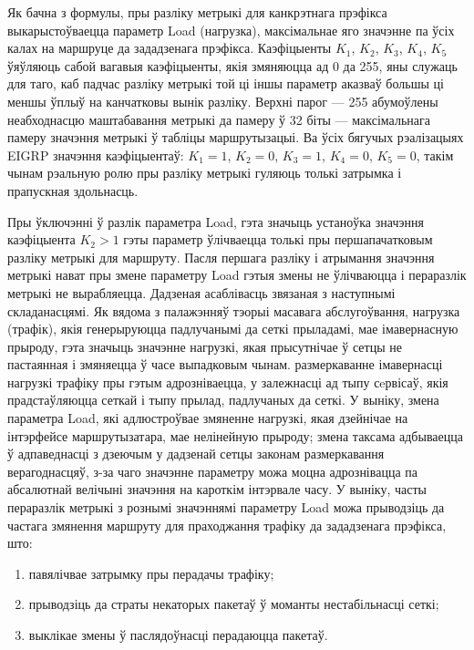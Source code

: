 Як бачна з формулы, пры разліку метрыкі для канкрэтнага прэфікса
выкарыстоўваецца параметр Load (нагрузка), максімальнае яго значэнне па ўсіх калах на маршруце да зададзенага прэфікса.
Каэфіцыенты $K_1$, $K_2$, $K_3$, $K_4$, $K_5$ ўяўляюць сабой вагавыя
каэфіцыенты, якія змяняюцца ад 0 да 255, яны служаць для таго, каб падчас разліку метрыкі
той ці іншы параметр аказваў большы ці меншы ўплыў на канчатковы
вынік разліку. Верхні парог --- 255 абумоўлены неабходнасцю маштабавання метрыкі да памеру ў 32 біты --- максімальнага памеру значэння
метрыкі ў табліцы маршрутызацыі. Ва ўсіх бягучых рэалізацыях EIGRP значэння
каэфіцыентаў: $K_1 = 1$, $K_2 = 0$, $K_3 = 1$, $K_4 = 0$, $K_5 = 0$, такім чынам рэальную ролю пры разліку
метрыкі гуляюць толькі затрымка і прапускная здольнасць.

Пры ўключэнні ў разлік параметра Load, гэта значыць устаноўка значэння
каэфіцыента $K_2 > 1$ гэты параметр ўлічваецца толькі пры першапачатковым
разліку метрыкі для маршруту. Пасля першага разліку і атрымання значэння
метрыкі нават пры змене параметру Load гэтыя змены не ўлічваюцца
і пераразлік метрыкі не вырабляецца. Дадзеная асаблівасць звязаная з наступнымі складанасцямі. Як вядома з палажэнняў тэорыі масавага абслугоўвання, нагрузка (трафік), якія генерыруюцца падлучанымі да сеткі прыладамі,
мае імавернасную прыроду, гэта значыць значэнне нагрузкі, якая прысутнічае ў сетцы
не пастаянная і змяняецца ў часе выпадковым чынам. размеркаванне імавернасці нагрузкі трафіку пры гэтым адрозніваецца, у залежнасці
ад тыпу сeрвісаў, якія прадстаўляюцца сеткай і тыпу прылад, падлучаных
да сеткі. У выніку, змена параметра Load, які адлюстроўвае змяненне
нагрузкі, якая дзейнічае на інтэрфейсе маршрутызатара, мае нелінейную
прыроду; змена таксама адбываецца ў адпаведнасці з дзеючым у дадзенай
сетцы законам размеркавання верагоднасцяў, з-за чаго значэнне параметру можа моцна адрознівацца па абсалютнай велічыні значэння на
кароткім інтэрвале часу. У выніку, часты пераразлік метрыкі з рознымі значэннямі параметру Load можа прыводзіць да частага
змянення маршруту для праходжання трафіку да зададзенага прэфікса, што:
\begin{enumerate}
    \item павялічвае затрымку пры перадачы трафіку;
    \item прыводзіць да страты некаторых пакетаў ў моманты нестабільнасці сеткі;
    \item выклікае змены ў паслядоўнасці перадаюцца пакетаў.
\end{enumerate}

